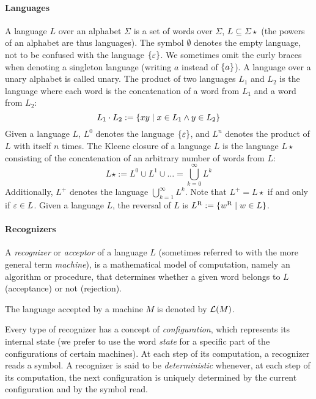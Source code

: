 \paragraph{Languages} A language $L$ over an alphabet $\Sigma$ is a set of words over $\Sigma$, \ie[,] $L\subseteq\Sigma\star$ (the powers of an alphabet are thus languages).
The symbol $\emptyset$ denotes the empty language, not to be confused with the language $\{\varepsilon\}$.
We sometimes omit the curly braces when denoting a singleton language (writing $a$ instead of $\{a\}$).
A language over a unary alphabet is called unary.
The product of two languages $L_1$ and $L_2$ is the language where each word is the concatenation of a word from $L_1$ and a word from $L_2$: \begin{equation*} L_1\cdot L_2 := \{xy\mid x\in L_1 \land y\in L_2\} \end{equation*} Given a language $L$, $L^0$ denotes the language $\{\varepsilon\}$, and $L^n$ denotes the product of $L$ with itself $n$ times.
The Kleene closure of a language $L$ is the language $L\star$ consisting of the concatenation of an arbitrary number of words from $L$: \begin{equation*} L\star := L^0\cup L^1\cup\dots=\bigcup_{k=0}^\infty L^k \end{equation*} Additionally, $L^+$ denotes the language $\bigcup_{k=1}^\infty L^k$.
Note that $L^+=L\star$ if and only if $\varepsilon\in L$.
Given a language $L$, the reversal of $L$ is $L^{\mathrm R}:=\{w^{\mathrm R} \mid w\in L\}$.

\paragraph{Recognizers} A \emph{recognizer} or \emph{acceptor} of a language $L$ (sometimes referred to with the more general term \emph{machine}), is a mathematical model of computation, namely an algorithm or procedure, that determines whether a given word belongs to $L$ (acceptance) or not (rejection).

The language accepted by a machine $M$ is denoted by $\mathcal L(M)$.

Every type of recognizer has a concept of \emph{configuration}, which represents its internal state (we prefer to use the word \emph{state} for a specific part of the configurations of certain machines).
At each step of its computation, a recognizer reads a symbol.
A recognizer is said to be \emph{deterministic} whenever, at each step of its computation, the next configuration is uniquely determined by the current configuration and by the symbol read.



